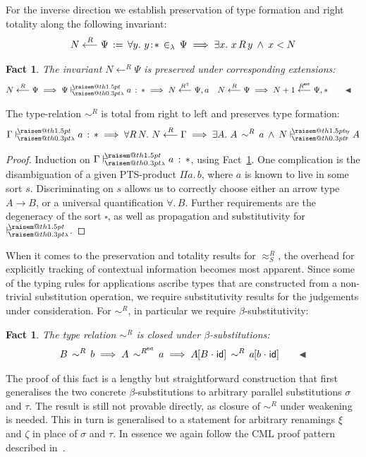\documentclass[a4paper,UKenglish]{lipics-v2016}
\makeatletter
\newcommand{\ms}{\,}
\newcommand{\mrel}[1]{\mathrel{\ms #1 \ms}}
\newcommand{\OF}{\mrel{:}}
\newcommand{\mAnd}{\mrel{\wedge}}
\newcommand{\mAll}[1]{\ensuremath{\forall} #1.\ms\ms}
\newcommand{\mEx}[1]{\ensuremath{\exists} #1.\ms\ms}
\newcommand{\eqdef}{\mrel{:=}}
\newcommand{\ty}{\mathsf{ty}}
\newcommand{\of}{\ensuremath{\!:\!}}
\newcommand{\raisemath}[1]{\mathpalette{\raisem@th{#1}}}
\newcommand{\raisem@th}[3]{\raisebox{#1}{\ensuremath{#2#3}}}
\newcommand{\tsAnnot}[2]{\vdash\hspace{-.7em}^{\raisemath{1.5pt}{\scriptscriptstyle{#2}}}_{\raisemath{0.3pt}{\scriptscriptstyle{#1}}}} %
\newcommand{\tfF}{\tsAnnot{\mathsf{F}}{\ty}}  %
\newcommand{\istyF}[2]{\ensuremath{{#1} \mathrel{\tfF} #2}}
\newcommand{\tyL}{\tsAnnot{\lambda}{}} %
\newcommand{\typingL}[3]{\ensuremath{{#1} \mathrel{\tyL} #2 \OF #3}}
\newcommand{\inL}{\mrel{\in_{\lambda}}}
\newcommand{\tyr}{\mathrel{\sim}}
\newcommand{\tmr}{\mathrel{\approx}}
\newcommand{\Rext}[1]{\ensuremath{#1^{\mathsf{ext}}}}
\newcommand{\Rshift}[1]{\ensuremath{#1^{\Uparrow}}}
\newcommand{\tyctxrelLF}[3]{\ensuremath{#1\mathrel{\mathop{\longleftarrow}^{#2}\limits}#3}}
\newcommand{\Prp}{\ensuremath{\textrm{\textasteriskcentered}}}
\newcommand{\Typ}{\ensuremath{\square}}
\newcommand{\All}{\ensuremath{\forall.\,}}
\newcommand{\Prod}[1]{\ensuremath{\Pi #1.\,}}
\newcommand{\subst}[1]{\hphantom{|}\!\![{#1}]}
\newcommand{\scons}{\mathbin{\hspace{0.05em}\cdot\hspace{0.05em}}}
\newcommand{\id}{\mathsf{id}}
\theoremstyle{plain}
\newtheorem{fact}[theorem]{Fact}
\makeatother
\begin{document}
For the inverse direction we establish preservation of type formation and right totality along the following invariant:
\begin{align*}
  \tyctxrelLF{N}{R}{\Psi} \eqdef \mAll {y} y\of\Prp \inL \Psi \implies \mEx x x\,R\,y \mAnd x < N
\end{align*}
\begin{fact}
  \label{fac:inv-tylf-ext}
  The invariant $\tyctxrelLF{N}{R}{\Psi}$ is preserved under corresponding extensions:
  \begin{align*}
    &\tyctxrelLF{N}{R}{\Psi} \implies \typingL{\Psi}{a}{\Prp} \implies \tyctxrelLF{N}{\Rshift{R}}{\Psi,a} & &\tyctxrelLF{N}{R}{\Psi} \implies \tyctxrelLF{N+1}{\Rext{R}}{\Psi,\Prp}\tag*{\qedsymbol}
  \end{align*}
\end{fact}
\begin{lemma}
  \label{lem:tyr_lf_tot_pres}
  The type-relation $\tyr^R$ is total from right to left and preserves type formation:
  \begin{align*}
    \typingL{\Gamma}{a}{\Prp} \implies \mAll {R\,N} \tyctxrelLF{N}{R}{\Gamma} \implies \mEx A A\,\tyr^R\,a \mAnd \istyF{N}{A}
  \end{align*}
\end{lemma}
\begin{proof}
  Induction on $\typingL{\Gamma}{a}{\Prp}$, using Fact~\ref{fac:inv-tylf-ext}.
  One complication is the disambiguation of a given PTS-product $\Prod{a} b$, where $a$ is known to live in some sort $s$.
  Discriminating on $s$ allows us to correctly choose either an arrow type $A \to B$, or a universal quantification $\All B$.
  Further requirements are the degeneracy of the sort $\Typ$, as well as propagation and substitutivity for $\tyL$.
\end{proof}

When it comes to the preservation and totality results for $\tmr^R_S$, the overhead for explicitly tracking of contextual information becomes most apparent.
Since some of the typing rules for applications ascribe types that are constructed from a non-trivial substitution operation, we require substitutivity results for the judgements under consideration.
For $\tyr^R$, in particular we require $\beta$-substitutivity:
\begin{fact}
  The type relation $\tyr^R$ is closed under $\beta$-substitutions:
  \begin{align*}
    B\,\tyr^R\,b \implies A\,\tyr^{\Rext{R}}\,a \implies A\subst{B\scons\id}\,\tyr^R\,a\subst{b\scons\id} \tag*{\qedsymbol}
  \end{align*}
\end{fact}
The proof of this fact is a lengthy but straightforward construction that first generalises the two concrete $\beta$-substitutions to arbitrary parallel substitutions $\sigma$ and $\tau$.
The result is still not provable directly, as closure of $\tyr^R$ under weakening is needed.
This in turn is generalised to a statement for arbitrary renamings $\xi$ and $\zeta$ in place of $\sigma$ and $\tau$.
In essence we again follow the CML proof pattern described in~\cite{KaiserEtAl:2017:sysf_pts_equiv_coq}.
\end{document}
